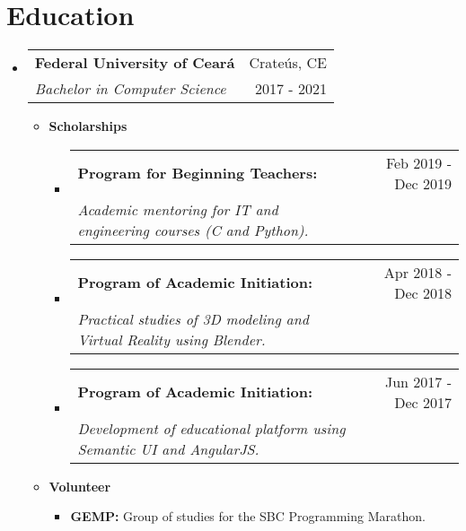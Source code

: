 \documentclass[letterpaper,11pt]{article}
\makeatletter
\newcommand{\resumeSubheading}[4]{
    \vspace{-1pt}\item
        \begin{tabular*}{0.97\textwidth}{l@{\extracolsep{\fill}}r}
            \textbf{#1} & #2 \\
            \textit{\small#3} & \small #4 \\
        \end{tabular*}
    \vspace{-5pt}
}
\newcommand{\resumeScholarship}[4]{
    \vspace{-1pt}\item
        \begin{tabular*}{0.89\textwidth}{l@{\extracolsep{\fill}}r}
            \textbf{#1} & #2 \\
            \textit{\small#3} & \small #4 \\
        \end{tabular*}\vspace{-5pt}
    \vspace{0.3cm}
}
\newcommand{\resumeSubHeadingListStart}{\begin{itemize}[leftmargin=*]}
\newcommand{\resumeSubHeadingListEnd}{\end{itemize}}
\makeatother
\begin{document}
\section{\faGraduationCap \hspace{0.2cm} \Large Education}
    \resumeSubHeadingListStart
        \resumeSubheading
        {Federal University of Ceará}{\faMapMarker \hspace{0.1cm} Crateús, CE}
        {Bachelor in Computer Science}{\faCalendar \hspace{0.1cm} 2017 - 2021}
        \begin{itemize}
            \item \textbf{Scholarships}
                \begin{itemize}
                    \resumeScholarship
                    {Program for Beginning Teachers:}{\faCalendar \hspace{0.1cm} \small Feb 2019 - Dec 2019}
                    {Academic mentoring for IT and engineering courses (C and Python).}{}
            
                    \resumeScholarship
                    {Program of Academic Initiation:}{\faCalendar \hspace{0.1cm} \small Apr 2018 - Dec 2018}
                    {Practical studies of 3D modeling and Virtual Reality using Blender.}{}
        
                    \resumeScholarship
                    {Program of Academic Initiation:}{\faCalendar \hspace{0.1cm} \small Jun 2017 - Dec 2017}
                    {Development of educational platform using Semantic UI and AngularJS.}{}
                \end{itemize}
        \end{itemize}
      
        \begin{itemize}
            \item \textbf{Volunteer}
                \begin{itemize}
                    \item \textbf{GEMP:} Group of studies for the SBC Programming Marathon. \href{https://github.com/GEMP-UFC-Crateus}{\faInfoCircle}
                \end{itemize}
        \end{itemize}
        
        \vspace{0.1cm}
    \resumeSubHeadingListEnd
  
\end{document}
